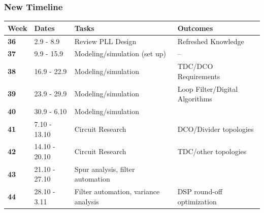 \documentclass[t, screen, aspectratio=43]{beamer}
\begin{document}
\begin{frame}
	\frametitle{New Timeline}
	\begin{table}[htb!]
		\tiny
		\centering
		\vspace{-1em}
		\def\arraystretch{1.5}		
		\setlength\arrayrulewidth{0.75pt}
		\setlength{\tabcolsep}{1em} %
		\begin{tabular}{|l|l|l|l|}
			\hline 
			\rule[-1ex]{0pt}{2.5ex} \cellcolor{gray!40}\textbf{Week} & \cellcolor{gray!40}\textbf{Dates} &\cellcolor{gray!40}\textbf{Tasks} & \cellcolor{gray!40}\textbf{Outcomes}\\ 
			\hline 
			\rule[-1ex]{0pt}{2.5ex} \cellcolor{red!20}\textbf{36}& \cellcolor{red!20}2.9 - 8.9 & \cellcolor{red!20}Review PLL Design & \cellcolor{red!20}Refreshed Knowledge\\ 
			\hline 
			\rule[-1ex]{0pt}{2.5ex} \cellcolor{red!20}\textbf{37}& \cellcolor{red!20}9.9 - 15.9 & \cellcolor{red!20}Modeling/simulation (set up) & \cellcolor{red!20}--\\ 
			\hline 
			\rule[-1ex]{0pt}{2.5ex} \cellcolor{red!20}\textbf{38}& \cellcolor{red!20}16.9 - 22.9 & \cellcolor{red!20}Modeling/simulation &\cellcolor{red!20}TDC/DCO Requirements\\ 
			\hline 
			\rule[-1ex]{0pt}{2.5ex} \cellcolor{red!20}\textbf{39}& \cellcolor{red!20}23.9 - 29.9& \cellcolor{red!20}Modeling/simulation& \cellcolor{red!20}Loop Filter/Digital Algorithms\\ 
			\hline 
			\rule[-1ex]{0pt}{2.5ex} \cellcolor{red!20}\textbf{40}& \cellcolor{red!20}30.9 - 6.10& \cellcolor{red!20}Modeling/simulation& \cellcolor{red!20}{Loop filter, DCO, TDC, calibration}\color{black}\\ 
			\hline 
			\rule[-1ex]{0pt}{2.5ex} \cellcolor{red!20}\textbf{41}&\cellcolor{red!20}7.10 - 13.10&\cellcolor{red!20}Circuit Research &\cellcolor{red!20}DCO/Divider topologies\\ 
			\hline 
			\rule[-1ex]{0pt}{2.5ex} \cellcolor{red!20}\textbf{42}&\cellcolor{red!20}14.10 - 20.10&\cellcolor{red!20}Circuit Research &\cellcolor{red!20}TDC/other topologies\\ 
			\hline 
			\rule[-1ex]{0pt}{2.5ex} \cellcolor{green!20}\textbf{43}&\cellcolor{green!20}21.10 - 27.10&\cellcolor{green!20}Spur analysis, filter automation &\cellcolor{green!20} \\ 
			\hline 
			\rule[-1ex]{0pt}{2.5ex} \textbf{44}& 28.10 - 3.11& Filter automation, variance analysis& DSP round-off optimization\\ 

\end{tabular}
\end{table}
\end{frame}
\end{document}
